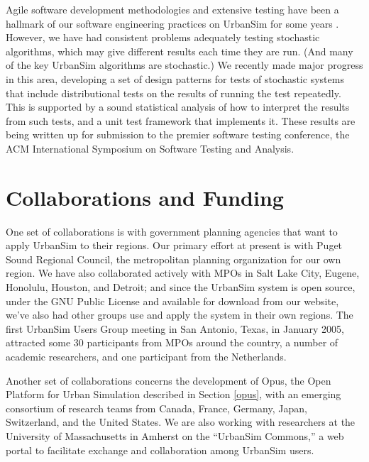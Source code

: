 \documentclass{acm_proc_article-sp}
\begin{document}
Agile software development methodologies and extensive testing have been a
hallmark of our software engineering practices on UrbanSim for some years
\cite{freeman-benson-agile-2003}.  However, we have had consistent problems
adequately testing stochastic algorithms, which may give different results
each time they are run.  (And many of the key UrbanSim algorithms are
stochastic.)  We recently made major progress in this area, developing a
set of design patterns for tests of stochastic systems that include
distributional tests on the results of running the test repeatedly.  This
is supported by a sound statistical analysis of how to interpret the
results from such tests, and a unit test framework that implements it.
These results are being written up for submission to the premier software
testing conference, the ACM International Symposium on Software Testing and
Analysis.

\section{Collaborations and Funding}

One set of collaborations is with government planning agencies that want to
apply UrbanSim to their regions.  Our primary effort at present is with
Puget Sound Regional Council, the metropolitan planning organization for
our own region.  We have also collaborated actively with MPOs in Salt Lake
City, Eugene, Honolulu, Houston, and Detroit; and since the UrbanSim system
is open source, under the GNU Public License and available for download
from our website, we've also had other groups use and apply the system in
their own regions.  The first UrbanSim Users Group meeting in San Antonio,
Texas, in January 2005, attracted some 30 participants from MPOs around the
country, a number of academic researchers, and one participant from the
Netherlands.

Another set of collaborations concerns the development of Opus,
the Open Platform for Urban Simulation described in Section
\ref{opus}, with an emerging consortium of research teams from
Canada, France, Germany, Japan, Switzerland, and the United
States. We are also working with researchers at the University of
Massachusetts in Amherst on the ``UrbanSim Commons,'' a web portal
to facilitate exchange and collaboration among UrbanSim users.
\end{document}
